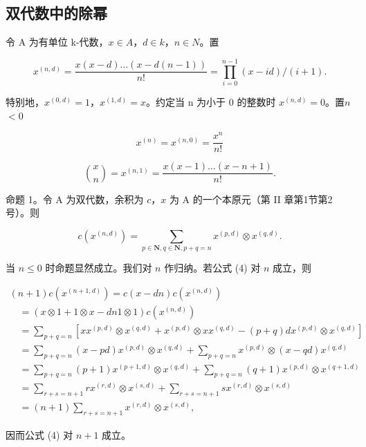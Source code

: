 \subsection{双代数中的除幂}

令 A 为有单位 k-代数，\(x \in A\)，\(d \in k\)，\(n \in N\)。置

\[
x ^ {(n, d)} = \frac {x (x - d) \dots (x - d (n - 1))}{n !} = \prod_ {i = 0} ^ {n - 1} (x - i d) / (i + 1).\tag{1}
\]

特别地，\(x^{(0,d)} = 1\)，\(x^{(1,d)} = x\)。约定当 n 为小于 0 的整数时 \(x^{(n,d)} = 0\)。置\(n\)\(< 0\)

\[
x ^ {(n)} = x ^ {(n, 0)} = \frac {x ^ {n}}{n !}\tag{2}
\]

\[
\binom {x} {n} = x ^ {(n, 1)} = \frac {x (x - 1) \ldots (x - n + 1)}{n !}.\tag{3}
\]

命题 1。令 A 为双代数，余积为 \(c\)，\(x\) 为 A 的一个本原元（第 II 章第1节第2号）。则

\[
c (x ^ {(n, d)}) = \sum_ {p \in \mathbf {N}, q \in \mathbf {N}, p + q = n} x ^ {(p, d)} \otimes x ^ {(q, d)}.\tag{4}
\]

当 \(n \leq 0\) 时命题显然成立。我们对 \(n\) 作归纳。若公式 (4) 对 \(n\) 成立，则

\[
\begin{array}{l} (n + 1) c (x ^ {(n + 1, d)}) = c (x - d n) c (x ^ {(n, d)}) \\ \quad = (x \otimes 1 + 1 \otimes x - d n   1 \otimes 1) c (x ^ {(n, d)}) \\ \quad = \sum_ {p + q = n} [ x x ^ {(p, d)} \otimes x ^ {(q, d)} + x ^ {(p, d)} \otimes x x ^ {(q, d)} - (p + q) d x ^ {(p, d)} \otimes x ^ {(q, d)} ] \\ \quad = \sum_ {p + q = n} (x - p d) x ^ {(p, d)} \otimes x ^ {(q, d)} + \sum_ {p + q = n} x ^ {(p, d)} \otimes (x - q d) x ^ {(q, d)} \\ \quad = \sum_ {p + q = n} (p + 1) x ^ {(p + 1, d)} \otimes x ^ {(q, d)} + \sum_ {p + q = n} (q + 1) x ^ {(p, d)} \otimes x ^ {(q + 1, d)} \\ \quad = \sum_ {r + s = n + 1} r x ^ {(r, d)} \otimes x ^ {(s, d)} + \sum_ {r + s = n + 1} s x ^ {(r, d)} \otimes x ^ {(s, d)} \\ \quad = (n + 1) \sum_ {r + s = n + 1} x ^ {(r, d)} \otimes x ^ {(s, d)}, \end{array}
\]

因而公式 (4) 对 \(n + 1\) 成立。

